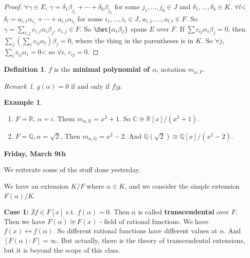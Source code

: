 \documentclass[9pt,reqno,twoside]{amsbook}
\theoremstyle{plain}
\numberwithin{section}{chapter}
\numberwithin{equation}{chapter}
\theoremstyle{definition}
\newtheorem{Def}[theorem]{Definition}
\newtheorem{Ex}[theorem]{Example}
\theoremstyle{remark}
\newtheorem{rem}[theorem]{Remark}
\theoremstyle{plain}
\newcommand{\R}{\mathbb{R}}
\newcommand{\Q}{\mathbb{Q}}
\renewcommand{\c}{\mathbb{C}}
\newcommand{\bb}{\vspace{3mm}}
\newcommand{\lpar}{\left(}
\newcommand{\rpar}{\right)}
\begin{document}
\begin{proof}
$\forall \gamma \in E$, $\gamma = \delta_1 \beta_{j_1} + \cdots + \delta_k \beta_{j_k}$ for some $j_1,...,j_k \in J$ and $\delta_1,...,\delta_k \in K$. $\forall l$< $\delta_l = a_{l,1}\alpha_{i_1} + \cdots + a_{l,t}\alpha_{i_t}$ for some $i_1,...,i_t \in J$, $a_{l,1},...,a_{l,t} \in F$. So $\gamma = \sum_{i,j} c_{i,j}\alpha_i\beta_j$, $c_{i,j} \in F$. So $\Set{\alpha_i\beta_j}$ spans $E$ over $F$. If $\sum c_{ij} \alpha_i\beta_j = 0$, then $\sum_j\lpar \sum_ic_{ij}\alpha_i \rpar \beta_j = 0$, where the thing in the parentheses is in $K$. So $\forall j$, $\sum_i c_{ij}\alpha_i = 0$< so $\forall i$, $c_{ij} = 0$. 
\end{proof}






\begin{Def}
$f$ is the \textbf{minimal polynomial of $\alpha$}, notation $m_{\alpha,F}$. 
\end{Def}

\begin{rem}
$g(\alpha) = 0$ if and only if $f|g$. 
\end{rem}

\begin{Ex}
\begin{enumerate}
\item $F = \R$, $\alpha = i$. Them $m_{\alpha,\R} = x^2 + 1$. So $\c \cong \R[x]/(x^2 + 1)$. 
\item $F = \Q, \alpha = \sqrt{2}$, Then $m_{\alpha,\Q} = x^2 - 2$. And $\Q(\sqrt{2}) \cong \Q[x]/(x^2 - 2)$. 
\end{enumerate}
\end{Ex}








\bb
\textbf{Friday, March 9th}

\bb

We reiterate some of the stuff done yesterday. 

We have an extension $K/F$ where $\alpha \in K$, and we consider the simple extension $F(\alpha)/K$. 


\textbf{Case 1: }$\nexists f \in F[x]$ s.t. $f(\alpha) = 0$. Then $\alpha$ is called \textbf{transcendental} over $F$. Then we have $F(\alpha) \cong F(x)$ - field of rational functions. We have $f(x) \leftrightarrow f(\alpha)$. So different rational functions have different values at $\alpha$. And $[F(\alpha):F] = \infty$. But actually, there is the theory of transcendental extensions, but it is beyond the scope of this class. 
\end{document}
